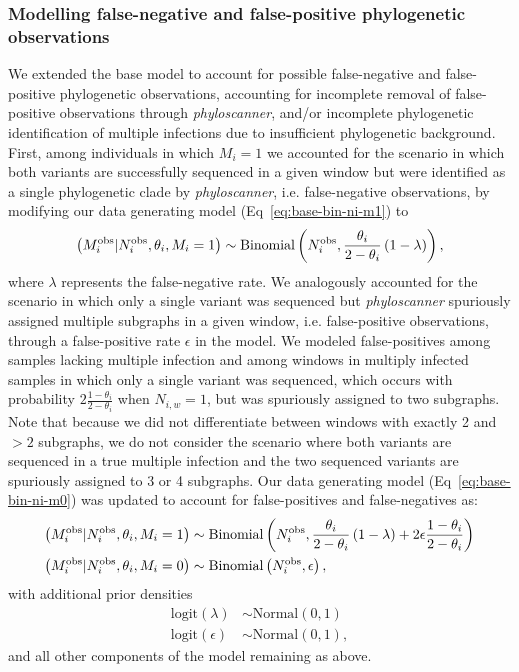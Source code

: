 \documentclass[10pt,letterpaper]{article}
\newcommand{\MI}{M^{\text{\text{obs}}}}
\begin{document}
\subsubsection{Modelling false-negative and false-positive phylogenetic observations}
\label{sec:full_model}
We extended the base model to account for possible false-negative and false-positive phylogenetic observations, accounting for incomplete removal of false-positive observations through \textit{phyloscanner}, and/or incomplete phylogenetic identification of multiple infections due to insufficient phylogenetic background. First, among individuals in which $M_i = 1$ we accounted for the scenario in which both variants are successfully sequenced in a given window but were identified as a single phylogenetic clade by \textit{phyloscanner}, i.e. false-negative observations, by modifying our data generating model (Eq~\ref{eq:base-bin-ni-m1}) to
\begin{equation}
\left(\MI_i|N^{\text{obs}}_i, \theta_i, M_i = 1\right) \sim \text{Binomial}\left(N^{\text{obs}}_i, \frac{\theta_i}{2-\theta_i}\left(1-\lambda\right)\right),
\end{equation}
where $\lambda$ represents the false-negative rate.
We analogously accounted for the scenario in which only a single variant was sequenced but \textit{phyloscanner} spuriously assigned multiple subgraphs in a given window, i.e. false-positive observations, through a false-positive rate  $\epsilon$ in the model. We modeled false-positives among samples lacking multiple infection and among windows in multiply infected samples in which only a single variant was sequenced, which occurs with probability $2\frac{1-\theta_i}{2-\theta_i}$ when $N_{i,w} = 1$, but was spuriously assigned to two subgraphs. Note that because we did not differentiate between windows with exactly 2 and $>2$ subgraphs, we do not consider the scenario where both variants are sequenced in a true multiple infection and the two sequenced variants are spuriously assigned to 3 or 4 subgraphs. Our data generating model (Eq~\ref{eq:base-bin-ni-m0}) was updated to account for false-positives and false-negatives as:
\begin{subequations}
 \label{eq:full_model_mi_distribution}
 \begin{align}
  \left(\MI_i|N^{\text{obs}}_i, \theta_i, M_i = 1\right) &\sim \text{Binomial}\left(N^{\text{obs}}_i, \frac{\theta_i}{2-\theta_i}\left(1-\lambda\right) + 2\epsilon\frac{1-\theta_i}{2-\theta_i} \right) \\
  \left(\MI_i|N^{\text{obs}}_i, \theta_i, M_i = 0\right) &\sim \text{Binomial}\left(N^{\text{obs}}_i, \epsilon\right),
 \end{align}
\end{subequations}
with additional prior densities
\begin{subequations}
\begin{align}
\text{logit}(\lambda) &\sim \text{Normal}(0,1) \\
\text{logit}(\epsilon) &\sim \text{Normal}(0,1),
\end{align}
\end{subequations}
and all other components of the model remaining as above.
\end{document}
